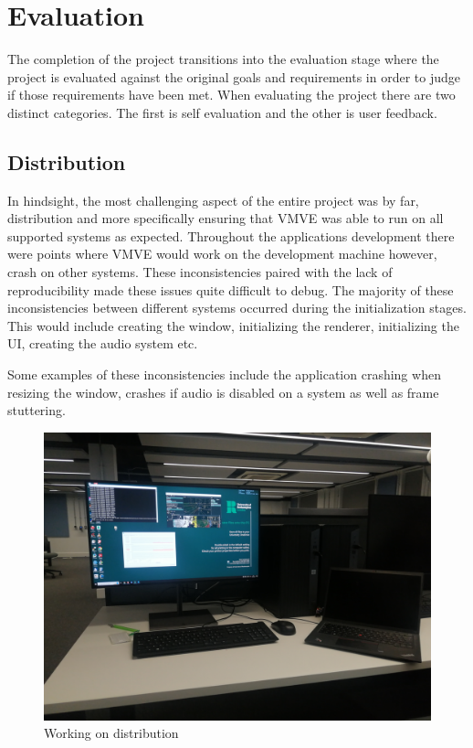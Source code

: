 \documentclass[11pt]{article}
\begin{document}
\section{Evaluation}
The completion of the project transitions into the evaluation stage where the
project is evaluated against the original goals and requirements in order to
judge if those requirements have been met. When evaluating the project there are
two distinct categories. The first is self evaluation and the other is user
feedback. 


\subsection{Distribution}
In hindsight, the most challenging aspect of the entire project was by far,
distribution and more specifically ensuring that VMVE was able to run on all
supported systems as expected. Throughout the applications development there
were points where VMVE would work on the development machine however, crash on
other systems. These inconsistencies paired with the lack of reproducibility
made these issues quite difficult to debug. The majority of these
inconsistencies between different systems occurred during the initialization
stages. This would include creating the window, initializing the renderer,
initializing the UI, creating the audio system etc.

Some examples of these inconsistencies include the application crashing when
resizing the window, crashes if audio is disabled on a system as well as frame
stuttering.

\begin{figure}[h!]
  \centering
  \includegraphics[width=\textwidth]{images/multiple_systems.png}
  \caption{Working on distribution}
  \label{fig:multiple_systems}
\end{figure}
\end{document}
